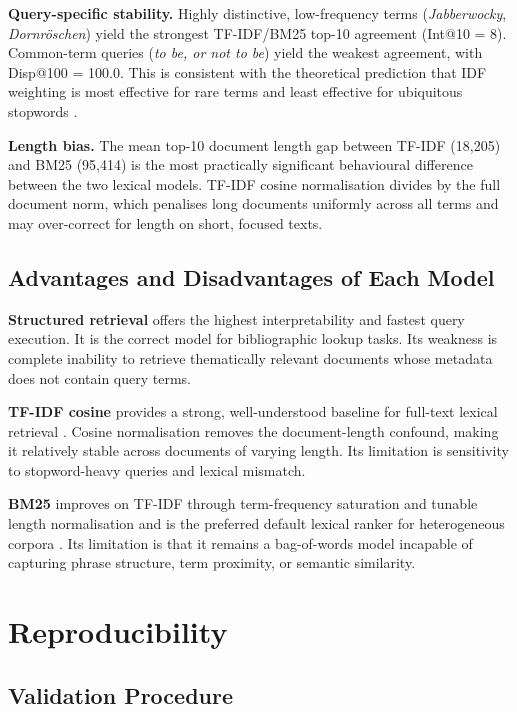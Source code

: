 \documentclass[sigconf]{acmart}
\begin{document}
\textbf{Query-specific stability.} Highly distinctive, low-frequency terms (\emph{Jabberwocky}, \emph{Dornr\"{o}schen}) yield the strongest TF-IDF/BM25 top-10 agreement (Int@10 = 8). Common-term queries (\emph{to be, or not to be}) yield the weakest agreement, with Disp@100 = 100.0. This is consistent with the theoretical prediction that IDF weighting is most effective for rare terms and least effective for ubiquitous stopwords \cite{manning2008}.

\textbf{Length bias.} The mean top-10 document length gap between TF-IDF (18,205) and BM25 (95,414) is the most practically significant behavioural difference between the two lexical models. TF-IDF cosine normalisation divides by the full document norm, which penalises long documents uniformly across all terms and may over-correct for length on short, focused texts.

\subsection{Advantages and Disadvantages of Each Model}

\textbf{Structured retrieval} offers the highest interpretability and fastest query execution. It is the correct model for bibliographic lookup tasks. Its weakness is complete inability to retrieve thematically relevant documents whose metadata does not contain query terms.

\textbf{TF-IDF cosine} provides a strong, well-understood baseline for full-text lexical retrieval \cite{salton1983}. Cosine normalisation removes the document-length confound, making it relatively stable across documents of varying length. Its limitation is sensitivity to stopword-heavy queries and lexical mismatch.

\textbf{BM25} improves on TF-IDF through term-frequency saturation and tunable length normalisation and is the preferred default lexical ranker for heterogeneous corpora \cite{robertson2009}. Its limitation is that it remains a bag-of-words model incapable of capturing phrase structure, term proximity, or semantic similarity.

\section{Reproducibility}

\subsection{Validation Procedure}
\end{document}
